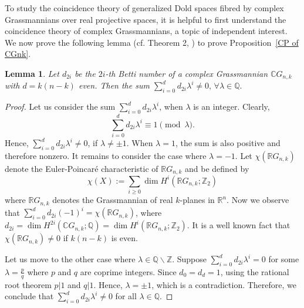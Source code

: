 \documentclass{amsart}
\newtheorem{lemma}[theorem]{Lemma}
\newcommand{\propref}[1]{Proposition~\ref{#1}}
\begin{document}
	To study the coincidence theory of generalized Dold spaces fibred by complex Grassmannians over real projective spaces, it is helpful to first understand the coincidence theory of complex Grassmannians, a topic of independent interest. We now %
prove the following lemma (cf. Theorem 2, \cite{glover-homer}) to %
prove \propref{CP of CGnk}.
	\begin{lemma}\label{sum neq 0}
		Let $d_{2i}$ be the $2i$-th Betti number of a complex Grassmannian $\mathbb CG_{n,k}$ with $d=k(n-k)$ even. Then the sum \(\sum _{i=0}^d d_{2i}\lambda^i\neq 0,\, \forall \lambda \in \mathbb Q.\)
	\end{lemma}
	\begin{proof}
		Let us consider the sum $\sum_{i=0}^d d_{2i}\lambda^i$, when $\lambda$ is an integer. 
		Clearly, $$\sum_{i=0}^d d_{2i}\lambda^i \equiv 1 \pmod{\lambda}.$$ %
		Hence, $\sum_{i=0}^d d_{2i}\lambda^i \neq 0$, if $\lambda \neq \pm 1$. When $\lambda = 1$, the sum is also positive and therefore nonzero. It remains to consider the case where $\lambda = -1$.
		Let $\chi(\mathbb{R}G_{n,k})$ denote the Euler-Poincaré characteristic of $\mathbb{R}G_{n,k}$ and be defined by $$\chi(X):=\sum_{i\ge0}\dim H^i(\mathbb{R}G_{n,k};\mathbb{Z}_2)$$ where $\mathbb{R}G_{n,k}$ denotes the Grassmannian of real $k$-planes in $\mathbb{R}^n$.
		Now we observe %
that 
		$\sum_{i=0}^d d_{2i}(-1)^i = \chi(\mathbb{R}G_{n,k})$, where %
$d_{2i} = \operatorname{dim} H^{2i}(\mathbb{C}G_{n,k}; \mathbb{Q}) = \dim H^{i}(\mathbb{R}G_{n,k}; \mathbb{Z}_2)$. 
		It is a well known fact that $\chi(\mathbb{R}G_{n,k}) \neq 0$ if $k(n-k)$ is even. 
		
		Let us move to the other case where $\lambda\in \mathbb{Q}\backslash \mathbb{Z}$. Suppose $\sum_{i=0}^{d} d_{2i}\lambda^i =0$ for some $\lambda = \frac{p}{q}$ where $p$ and $q$ are coprime integers. Since $d_0 =d_d =1$, using the rational %
root theorem $p|1$ %
and $q|1$. Hence, $\lambda = \pm 1$, which is a contradiction. Therefore, we conclude that $\sum_{i=0}^{d} d_{2i}\lambda^i \neq 0$ for all $\lambda\in \mathbb Q$. 
	\end{proof}
	
\end{document}
